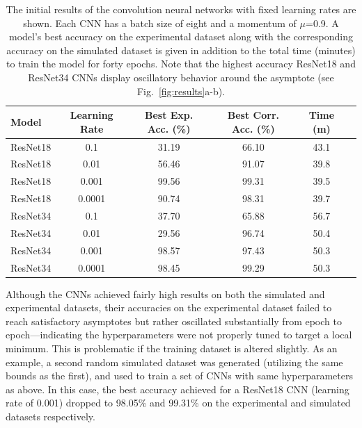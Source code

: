 \documentclass[10pt,journal,compsoc]{IEEEtran}
\begin{document}
\begin{table}
\centering
{\scriptsize
\begin{tabular}{lccccc}
\toprule
    Model &  Learning Rate &  Best Exp. Acc. (\%) &  Best Corr. Acc. (\%) &  Time (m) \\
\midrule
 ResNet18 &         0.1 &               31.19 &                66.10 &      43.1 \\
 ResNet18 &         0.01 &               56.46 &                91.07 &      39.8 \\
 ResNet18 &         0.001 &               99.56 &                99.31 &      39.5 \\
 ResNet18 &         0.0001 &               90.74 &                98.31 &      39.7 \\
 ResNet34 &         0.1 &               37.70 &                65.88 &      56.7 \\
 ResNet34 &         0.01 &               29.56 &                96.74 &      50.4 \\
 ResNet34 &         0.001 &               98.57 &                97.43 &      50.3 \\
 ResNet34 &         0.0001 &               98.45 &                99.29 &      50.3 \\
\bottomrule
\end{tabular}
}
  \caption{\label{table:fixed_results}The initial results of the convolution neural networks with fixed learning rates are shown. Each CNN has a batch size of eight and a momentum of $\mu$=0.9. A model's best accuracy on the experimental dataset along with the corresponding accuracy on the simulated dataset is given in addition to the total time (minutes) to train the model for forty epochs. Note that the highest accuracy ResNet18 and ResNet34 CNNs display oscillatory behavior around the asymptote (see Fig.~\ref{fig:results}a-b).}
\end{table}

Although the CNNs achieved fairly high results on both the simulated and experimental datasets, their accuracies on the experimental dataset failed to reach satisfactory asymptotes but rather oscillated substantially from epoch to epoch---indicating the hyperparameters were not properly tuned to target a local minimum. This is problematic if the training dataset is altered slightly. As an example, a second random simulated dataset was generated (utilizing the same bounds as the first), and used to train a set of CNNs with same hyperparameters as above. In this case, the best accuracy achieved for a ResNet18 CNN (learning rate of 0.001) dropped to 98.05\% and 99.31\% on the experimental and simulated datasets respectively.
\end{document}
